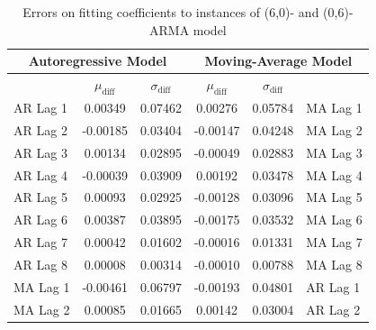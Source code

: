 \documentclass[oneside,12pt,openany]{book}
\begin{document}
    \begin{table}[hbt!]
        \centering
        \begin{tabular}{|l|c|c|c|c|l|}
            \hline
            \multicolumn{3}{|c|}{\textbf{Autoregressive Model}}   & \multicolumn{3}{c|}{\textbf{Moving-Average Model}}     \\ \hline
            \cellcolor{black} & $\mu_{\text{diff}}$ & $\sigma_{\text{diff}}$ & $\mu_{\text{diff}}$ & $\sigma_{\text{diff}}$ & \cellcolor{black}         \\ \hline
            AR Lag 1 & 0.00349                  & 0.07462                    & 0.00276                  & 0.05784                    & MA Lag 1 \\ \hline
            AR Lag 2 & -0.00185                 & 0.03404                    & -0.00147                 & 0.04248                    & MA Lag 2 \\ \hline
            AR Lag 3 & 0.00134                  & 0.02895                    & -0.00049                 & 0.02883                    & MA Lag 3 \\ \hline
            AR Lag 4 & -0.00039                 & 0.03909                    & 0.00192                  & 0.03478                    & MA Lag 4 \\ \hline
            AR Lag 5 & 0.00093                  & 0.02925                    & -0.00128                 & 0.03096                    & MA Lag 5 \\ \hline
            AR Lag 6 & 0.00387                  & 0.03895                    & -0.00175                 & 0.03532                    & MA Lag 6 \\ \hline
            AR Lag 7 & 0.00042                  & 0.01602                    & -0.00016                 & 0.01331                    & MA Lag 7 \\ \hline
            AR Lag 8 & 0.00008                   & 0.00314                    & -0.00010                  & 0.00788                    & MA Lag 8 \\ \hline
            MA Lag 1 & -0.00461                 & 0.06797                    & -0.00193                 & 0.04801                    & AR Lag 1 \\ \hline
            MA Lag 2 & 0.00085                  & 0.01665                    & 0.00142                  & 0.03004                    & AR Lag 2 \\ \hline
        \end{tabular}
        \caption{Errors on fitting coefficients to instances of (6,0)- and (0,6)-ARMA model}
        \label{tab:errortsfitting6}
    \end{table}
    
\end{document}
